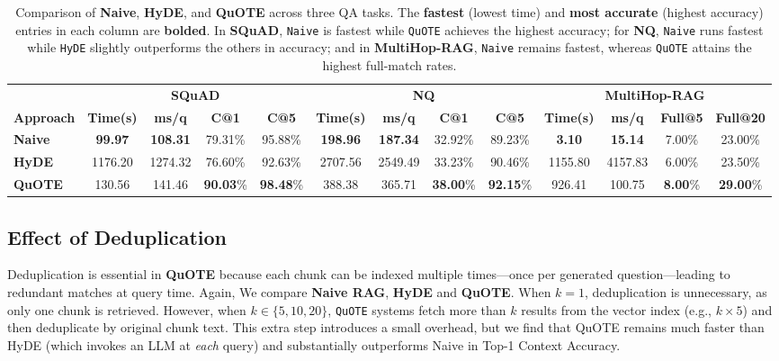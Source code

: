 \begin{table*}[t]
\centering
\caption{Comparison of \textbf{Naive}, \textbf{HyDE}, and \textbf{QuOTE} across three QA tasks. 
The \textbf{fastest} (lowest time) and \textbf{most accurate} (highest accuracy) entries in each column are \textbf{bolded}. 
In \textbf{SQuAD}, \texttt{Naive} is fastest while \texttt{QuOTE} achieves the highest accuracy; 
for \textbf{NQ}, \texttt{Naive} runs fastest while \texttt{HyDE} slightly outperforms the others in accuracy; 
and in \textbf{MultiHop-RAG}, \texttt{Naive} remains fastest, whereas \texttt{QuOTE} attains the highest full-match rates.}
\label{tab:hyde-comparison}
\renewcommand{\arraystretch}{1.15}
\setlength{\tabcolsep}{3pt}
\begin{tabular}{l|cccc|cccc|cccc}
\toprule
& \multicolumn{4}{c|}{\textbf{SQuAD}} 
& \multicolumn{4}{c|}{\textbf{NQ}} 
& \multicolumn{4}{c}{\textbf{MultiHop-RAG}} \\
\cmidrule(lr){2-5}\cmidrule(lr){6-9}\cmidrule(lr){10-13}
\textbf{Approach} 
& \textbf{Time(s)} & \textbf{ms/q} & \textbf{C@1} & \textbf{C@5}
& \textbf{Time(s)} & \textbf{ms/q} & \textbf{C@1} & \textbf{C@5}
& \textbf{Time(s)} & \textbf{ms/q} & \textbf{Full@5} & \textbf{Full@20} \\
\midrule
\textbf{Naive} & 
\textbf{99.97} & \textbf{108.31} & 79.31\% & 95.88\% & 
\textbf{198.96} & \textbf{187.34} & 32.92\% & 89.23\% & 
\textbf{3.10} & \textbf{15.14} & 7.00\% & 23.00\% \\
\textbf{HyDE} &
1176.20 & 1274.32 & 76.60\% & 92.63\% & 
2707.56 & 2549.49 & 33.23\% & 90.46\% &
1155.80 & 4157.83 & 6.00\% & 23.50\% \\
\textbf{QuOTE} &
130.56 & 141.46 & \textbf{90.03}\% & \textbf{98.48}\% & 
388.38 & 365.71 & \textbf{38.00}\% & \textbf{92.15}\% &
926.41 & 100.75 & \textbf{8.00}\% & \textbf{29.00}\% \\
\bottomrule
\end{tabular}
\end{table*}

\subsection{Effect of Deduplication}
\label{subsec:dedup-effect}

Deduplication is essential in \textbf{QuOTE} because each chunk can be indexed multiple times---once per generated question---leading to redundant matches at query time. Again, We compare \textbf{Naive RAG},
\textbf{HyDE} and
\textbf{QuOTE}.
When $k=1$, deduplication is unnecessary, as only one chunk is retrieved. However, when $k \in \{5,10,20\}$, \texttt{QuOTE} systems 
fetch more than $k$ results from the vector index (e.g., $k \times 5$) 
and then deduplicate by original chunk text. This extra step 
introduces a small overhead, but we find that QuOTE remains much faster than HyDE (which invokes an LLM at \emph{each} query) 
and substantially outperforms Naive in Top-1 Context Accuracy.

